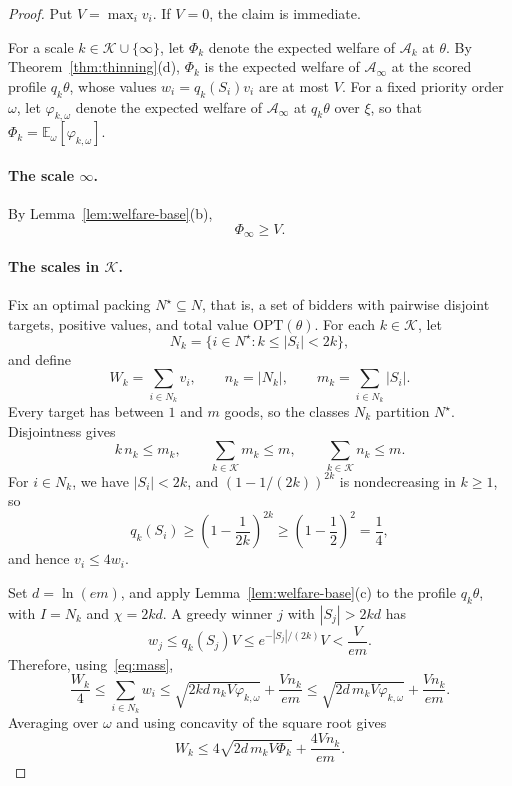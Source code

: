 \documentclass[format=acmsmall, review=false]{acmart}
\newcommand{\E}{\mathbb{E}}
\newcommand{\OPT}{\mathrm{OPT}}
\begin{document}
\begin{proof}
Put \(V=\max_iv_i\). If \(V=0\), the claim is immediate.

For a scale \(k\in\mathcal K\cup\{\infty\}\), let \(\Phi_k\)
denote the expected welfare of \(\mathcal A_k\) at \(\theta\). By
Theorem~\ref{thm:thinning}(d), \(\Phi_k\) is the expected welfare
of \(\mathcal A_\infty\) at the scored profile \(q_k\theta\),
whose values \(w_i=q_k(S_i)v_i\) are at most \(V\). For a fixed
priority order \(\omega\), let \(\varphi_{k,\omega}\) denote the
expected welfare of \(\mathcal A_\infty\) at \(q_k\theta\) over
\(\xi\), so that \(\Phi_k=\E_\omega[\varphi_{k,\omega}]\).

\paragraph{The scale \(\infty\).}
By Lemma~\ref{lem:welfare-base}(b),
\begin{equation}\label{eq:top}
\Phi_\infty\ge V.
\end{equation}

\paragraph{The scales in \(\mathcal K\).}
Fix an optimal packing \(N^\star\subseteq N\), that is, a set of
bidders with pairwise disjoint targets, positive values, and
total value \(\OPT(\theta)\). For each \(k\in\mathcal K\), let
\[
N_k=\{i\in N^\star:k\le |S_i|<2k\},
\]
and define
\[
W_k=\sum_{i\in N_k}v_i,\qquad
n_k=|N_k|,\qquad
m_k=\sum_{i\in N_k}|S_i|.
\]
Every target has between \(1\) and \(m\) goods, so the classes
\(N_k\) partition \(N^\star\). Disjointness gives
\begin{equation}\label{eq:mass}
k\,n_k\le m_k,\qquad
\sum_{k\in\mathcal K}m_k\le m,\qquad
\sum_{k\in\mathcal K}n_k\le m.
\end{equation}
For \(i\in N_k\), we have \(|S_i|<2k\), and
\((1-1/(2k))^{2k}\) is nondecreasing in \(k\ge1\), so
\[
q_k(S_i)
\ge
\left(1-\frac{1}{2k}\right)^{2k}
\ge\left(1-\frac12\right)^{2}
=\frac14,
\]
and hence \(v_i\le4w_i\).

Set \(d=\ln(em)\), and apply Lemma~\ref{lem:welfare-base}(c) to
the profile \(q_k\theta\), with \(I=N_k\) and \(\chi=2kd\). A
greedy winner \(j\) with \(|S_j|>2kd\) has
\[
w_j\le q_k(S_j)V
\le e^{-|S_j|/(2k)}V
<\frac{V}{em}.
\]
Therefore, using~\eqref{eq:mass},
\[
\frac{W_k}{4}
\le\sum_{i\in N_k}w_i
\le\sqrt{2kd\,n_kV\varphi_{k,\omega}}+\frac{Vn_k}{em}
\le\sqrt{2d\,m_kV\varphi_{k,\omega}}+\frac{Vn_k}{em}.
\]
Averaging over \(\omega\) and using concavity of the square root
gives
\begin{equation}\label{eq:class}
W_k
\le
4\sqrt{2d\,m_kV\Phi_k}
+
\frac{4Vn_k}{em}.
\end{equation}


\end{proof}
\end{document}
